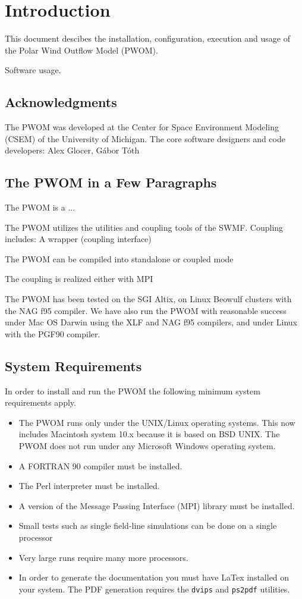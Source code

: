 
\chapter{Introduction}

This document descibes the installation, configuration, execution and 
usage of the Polar Wind Outflow Model (PWOM).

Software usage.

\section{Acknowledgments}

The PWOM was developed at the Center for Space Environment Modeling
(CSEM) of the University of Michigan. 
The core software designers and code developers: Alex Glocer, G\'abor T\'oth

\section{The PWOM in a Few Paragraphs}

The PWOM is a ... 

The PWOM utilizes the utilities and coupling tools of the SWMF. 
Coupling includes: A wrapper (coupling interface)

The PWOM can be compiled into standalone or coupled mode

The coupling is realized either with MPI

The PWOM has been tested on the SGI Altix, on Linux Beowulf clusters with the 
NAG f95 compiler. We have also run the PWOM with reasonable success under
Mac OS Darwin using the XLF and NAG f95 compilers, and under Linux with
the PGF90 compiler.

\section{System Requirements}

In order to install and run the PWOM the following minimum system
requirements apply.

\begin{itemize}
\item The PWOM runs only under the UNIX/Linux operating systems.  This now
  includes Macintosh system 10.x because it is based on BSD UNIX.  The
  PWOM does not run under any Microsoft Windows operating system.
\item A FORTRAN 90 compiler must be installed.
\item The Perl interpreter must be installed.
\item A version of the Message Passing Interface (MPI) library must be
  installed.
\item Small tests such as single  field-line simulations can be done on a 
  single processor
\item Very large runs require many more processors.
\item In order to generate the documentation you must have LaTex installed on
your system.  The PDF generation requires the {\tt dvips} and {\tt ps2pdf}
utilities. 

\end{itemize}


